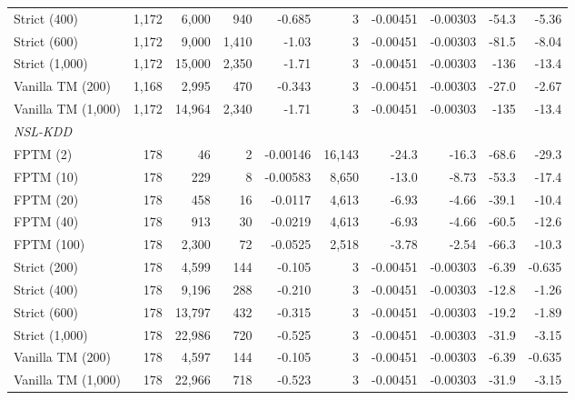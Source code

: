 \begin{tabular}{lrrrrrrrrr}
Strict (400) & 1,172 & 6,000 & 940 & \hyp{0.685} & 3 & \hyp{0.00451} & \hyp{0.00303} & \hyp{54.3} & \hyp{5.36} \\
Strict (600) & 1,172 & 9,000 & 1,410 & \hyp{1.03} & 3 & \hyp{0.00451} & \hyp{0.00303} & \hyp{81.5} & \hyp{8.04} \\
Strict (1,000) & 1,172 & 15,000 & 2,350 & \hyp{1.71} & 3 & \hyp{0.00451} & \hyp{0.00303} & \hyp{136} & \hyp{13.4} \\
Vanilla TM (200) & 1,168 & 2,995 & 470 & \hyp{0.343} & 3 & \hyp{0.00451} & \hyp{0.00303} & \hyp{27.0} & \hyp{2.67} \\
Vanilla TM (1,000) & 1,172 & 14,964 & 2,340 & \hyp{1.71} & 3 & \hyp{0.00451} & \hyp{0.00303} & \hyp{135} & \hyp{13.4} \\
\midrule
\multicolumn{10}{l}{\textit{NSL-KDD}} \\
FPTM (2) & 178 & 46 & 2 & \hyp{0.00146} & 16,143 & \hyp{24.3} & \hyp{16.3} & \hyp{68.6} & \hyp{29.3} \\
FPTM (10) & 178 & 229 & 8 & \hyp{0.00583} & 8,650 & \hyp{13.0} & \hyp{8.73} & \hyp{53.3} & \hyp{17.4} \\
FPTM (20) & 178 & 458 & 16 & \hyp{0.0117} & 4,613 & \hyp{6.93} & \hyp{4.66} & \hyp{39.1} & \hyp{10.4} \\
FPTM (40) & 178 & 913 & 30 & \hyp{0.0219} & 4,613 & \hyp{6.93} & \hyp{4.66} & \hyp{60.5} & \hyp{12.6} \\
FPTM (100) & 178 & 2,300 & 72 & \hyp{0.0525} & 2,518 & \hyp{3.78} & \hyp{2.54} & \hyp{66.3} & \hyp{10.3} \\
Strict (200) & 178 & 4,599 & 144 & \hyp{0.105} & 3 & \hyp{0.00451} & \hyp{0.00303} & \hyp{6.39} & \hyp{0.635} \\
Strict (400) & 178 & 9,196 & 288 & \hyp{0.210} & 3 & \hyp{0.00451} & \hyp{0.00303} & \hyp{12.8} & \hyp{1.26} \\
Strict (600) & 178 & 13,797 & 432 & \hyp{0.315} & 3 & \hyp{0.00451} & \hyp{0.00303} & \hyp{19.2} & \hyp{1.89} \\
Strict (1,000) & 178 & 22,986 & 720 & \hyp{0.525} & 3 & \hyp{0.00451} & \hyp{0.00303} & \hyp{31.9} & \hyp{3.15} \\
Vanilla TM (200) & 178 & 4,597 & 144 & \hyp{0.105} & 3 & \hyp{0.00451} & \hyp{0.00303} & \hyp{6.39} & \hyp{0.635} \\
Vanilla TM (1,000) & 178 & 22,966 & 718 & \hyp{0.523} & 3 & \hyp{0.00451} & \hyp{0.00303} & \hyp{31.9} & \hyp{3.15} \\
\bottomrule
\end{tabular}
